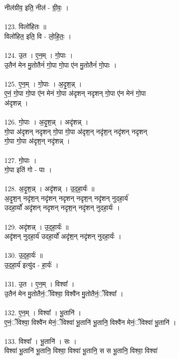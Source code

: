 नील॑ग्रीव॒ इति॒ नील॑ - ग्री॒वः॒ ।\\
\\
123. विलो॑हितः ॥\\
विलो॑हित॒ इति॒ वि - लो॒हि॒तः॒ ।\\
\\
124. उ॒त । ए॒न॒म् । गो॒पाः ।\\
उ॒तैन॑ मेन मु॒तोतैनं॑ गो॒पा गो॒पा ए॑न मु॒तोतैनं॑ गो॒पाः ।\\
\\
125. ए॒न॒म् । गो॒पाः । अ॒दृ॒श॒न्न् ।\\
ए॒नं॒ गो॒पा गो॒पा ए॑न मेनं गो॒पा अ॑दृशन् नदृशन् गो॒पा ए॑न मेनं गो॒पा\\
अ॑दृशन्न् ।\\
\\
126. गो॒पाः । अ॒दृ॒श॒न्न् । अदृ॑शन्न् ।\\
गो॒पा अ॑दृशन् नदृशन् गो॒पा गो॒पा अ॑दृश॒न् नदृ॑श॒न् नदृ॑शन् नदृशन्\\
गो॒पा गो॒पा अ॑दृश॒न् नदृ॑शन्न् ।\\
\\
127. गो॒पाः ।\\
गो॒पा इति॑ गो - पाः ।\\
\\
128. अ॒दृ॒श॒न्न् । अदृ॑शन्न् । उ॒द॒हा॒र्यः॑ ॥\\
अ॒दृ॒श॒न् नदृ॑श॒न् नदृ॑शन् नदृशन् नदृश॒न् नदृ॑शन् नुदहा॒र्य॑\\
उदहा॒र्यो॑ अदृ॑शन् नदृशन् नदृश॒न् नदृ॑शन् नुदहा॒र्यः॑ ।\\
\\
129. अदृ॑शन्न् । उ॒द॒हा॒र्यः॑ ॥\\
अदृ॑शन् नुदहा॒र्य॑ उदहा॒र्यो॑ अदृ॑श॒न् नदृ॑शन् नुदहा॒र्यः॑ ।\\
\\
130. उ॒द॒हा॒र्यः॑ ॥\\
उ॒द॒हा॒र्य॑ इत्यु॑द - हा॒र्यः॑ ।\\
\\
131. उ॒त । ए॒न॒म् । विश्वा᳚ ।\\
उ॒तैन॑ मेन मु॒तोतैनं॒ँविश्वा॒ विश्वै॑न मु॒तोतैनं॒ँविश्वा᳚ ।\\
\\
132. ए॒न॒म् । विश्वा᳚ । भू॒तानि॑ ।\\
ए॒नं॒ँविश्वा॒ विश्वै॑न मेनं॒ँविश्वा॑ भू॒तानि॑ भू॒तानि॒ विश्वै॑न मेनं॒ँविश्वा॑ भू॒तानि॑ ।\\
\\
133. विश्वा᳚ । भू॒तानि॑ । सः ।\\
विश्वा॑ भू॒तानि॑ भू॒तानि॒ विश्वा॒ विश्वा॑ भू॒तानि॒ स स भू॒तानि॒ विश्वा॒ विश्वा॑\\

